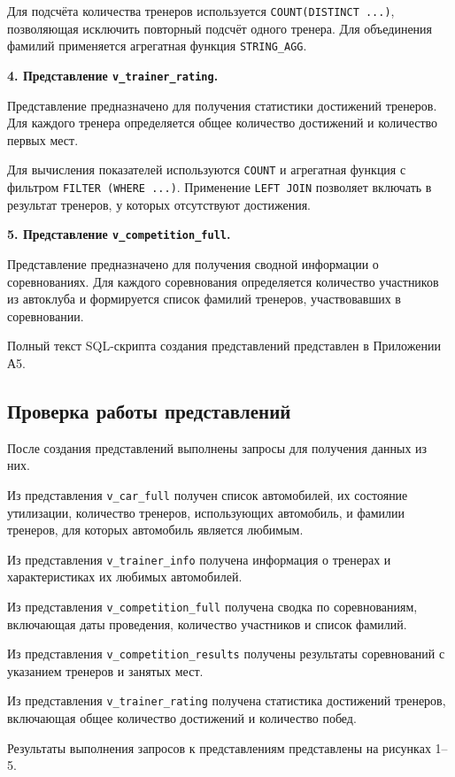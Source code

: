 \documentclass[oneside,a4paper,14pt]{extarticle}
\begin{document}
Для подсчёта количества тренеров используется \texttt{COUNT(DISTINCT ...)}, позволяющая исключить повторный подсчёт одного тренера. Для объединения фамилий применяется агрегатная функция \texttt{STRING\_AGG}.

\textbf{4. Представление \texttt{v\_trainer\_rating}.}

Представление предназначено для получения статистики достижений тренеров. Для каждого тренера определяется общее количество достижений и количество первых мест.

Для вычисления показателей используются \texttt{COUNT} и агрегатная функция с фильтром \texttt{FILTER (WHERE ...)}. Применение \texttt{LEFT JOIN} позволяет включать в результат тренеров, у которых отсутствуют достижения.

\textbf{5. Представление \texttt{v\_competition\_full}.}

Представление предназначено для получения сводной информации о соревнованиях. Для каждого соревнования определяется количество участников из автоклуба и формируется список фамилий тренеров, участвовавших в соревновании.

Полный текст SQL-скрипта создания представлений представлен в Приложении А5.

\subsection{Проверка работы представлений}

После создания представлений выполнены запросы для получения данных из них.

Из представления \texttt{v\_car\_full} получен список автомобилей, их состояние утилизации, количество тренеров, использующих автомобиль, и фамилии тренеров, для которых автомобиль является любимым.

Из представления \texttt{v\_trainer\_info} получена информация о тренерах и характеристиках их любимых автомобилей.

Из представления \texttt{v\_competition\_full} получена сводка по соревнованиям, включающая даты проведения, количество участников и список фамилий.

Из представления \texttt{v\_competition\_results} получены результаты соревнований с указанием тренеров и занятых мест.

Из представления \texttt{v\_trainer\_rating} получена статистика достижений тренеров, включающая общее количество достижений и количество побед.

Результаты выполнения запросов к представлениям представлены на рисунках 1--5.
\end{document}
